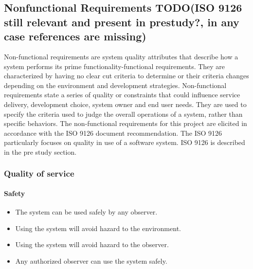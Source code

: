 \newpage
\subsection{Nonfunctional Requirements TODO(ISO 9126 still relevant and present in prestudy?, in any case references are missing)}
Non-functional requirements are system quality attributes that describe how a system performs its prime functionality-functional requirements. 
They are characterized by having no clear cut criteria to determine or their criteria 
changes depending on the environment and development strategies. 
Non-functional requirements state a series of quality or constraints that could influence service delivery, 
development choice, system owner and end user needs. 
They are used to specify the criteria used to judge the overall operations of a system, 
rather than specific behaviors. 
The non-functional requirements for this project are elicited in accordance with the ISO 9126 document recommendation. 
The ISO 9126 particularly focuses on quality in use of a software system. 
ISO 9126 is described in the pre study section.
\\[0.4cm]

\subsubsection{Quality of service}
	\paragraph{Safety}

	\begin{itemize}
		\item The system can be used safely by any observer.
        \item Using the system will avoid hazard to the environment.
        \item Using the system will avoid hazard to the observer.
        \item Any authorized observer can use the system safely.
	\end{itemize}
